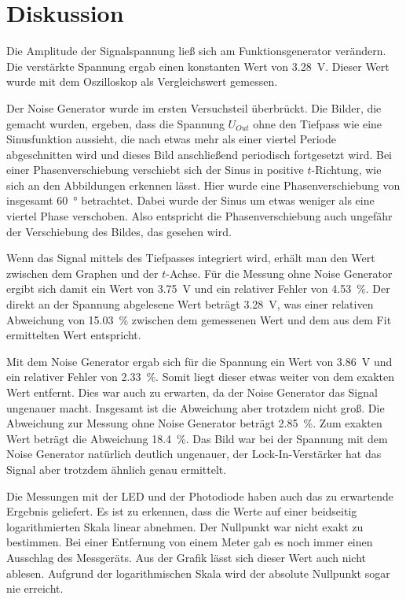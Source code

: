 \section{Diskussion}
\label{sec:Diskussion}

Die Amplitude der Signalspannung ließ sich am Funktionsgenerator verändern. Die verstärkte Spannung ergab einen konstanten 
Wert von \SI{3.28}{\V}. Dieser Wert wurde mit dem Oszilloskop als Vergleichswert gemessen.

\noindent Der Noise Generator wurde im ersten Versuchsteil überbrückt. Die Bilder, die gemacht wurden, ergeben, dass 
die Spannung $U_{Out}$ ohne den Tiefpass wie eine Sinusfunktion aussieht, die nach etwas mehr als einer viertel 
Periode abgeschnitten wird und dieses Bild anschließend periodisch fortgesetzt wird. 
Bei einer Phasenverschiebung verschiebt sich der Sinus in positive $t$-Richtung, wie sich an den Abbildungen 
erkennen lässt. Hier wurde eine Phasenverschiebung von insgesamt \SI{60}{\degree} betrachtet.
Dabei wurde der Sinus 
um etwas weniger als eine viertel Phase verschoben. Also entspricht die Phasenverschiebung auch ungefähr der 
Verschiebung des Bildes, das gesehen wird. 

\noindent Wenn das Signal mittels des Tiefpasses integriert wird, erhält man den Wert zwischen dem Graphen und der 
$t$-Achse. Für die Messung ohne Noise Generator ergibt sich damit ein Wert von \SI{3.75}{\volt} und ein relativer 
Fehler von \SI{4.53}{\percent}. Der direkt an der Spannung abgelesene Wert beträgt \SI{3.28}{\volt}, was einer
relativen Abweichung von \SI{15.03}{\percent} zwischen dem gemessenen Wert und dem aus dem Fit ermittelten Wert 
entspricht. 

\noindent Mit dem Noise Generator ergab sich für die Spannung ein Wert von \SI{3.86}{\volt} und ein relativer 
Fehler von \SI{2.33}{\percent}. Somit liegt dieser etwas weiter von dem exakten Wert entfernt. Dies war auch zu 
erwarten, da der Noise Generator das Signal ungenauer macht. Insgesamt ist die Abweichung aber trotzdem nicht
groß. Die Abweichung zur Messung ohne Noise Generator beträgt \SI{2.85}{\percent}. Zum exakten Wert beträgt die 
Abweichung \SI{18.4}{\percent}. Das Bild war bei der Spannung mit dem Noise Generator natürlich deutlich ungenauer, 
der Lock-In-Verstärker hat das Signal aber trotzdem ähnlich genau ermittelt. 

\noindent Die Messungen mit der LED und der Photodiode haben auch das zu erwartende Ergebnis geliefert. Es ist zu 
erkennen, dass die Werte auf einer beidseitig logarithmierten Skala linear abnehmen. Der Nullpunkt war nicht exakt 
zu bestimmen. Bei einer Entfernung von einem Meter gab es noch immer einen Ausschlag des Messgeräts. Aus der Grafik 
lässt sich dieser Wert auch nicht ablesen. Aufgrund der logarithmischen Skala wird der absolute Nullpunkt sogar nie 
erreicht.  
